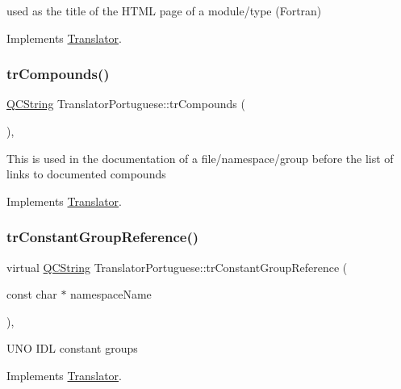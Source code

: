 used as the title of the H\+T\+ML page of a module/type (Fortran) 

Implements \mbox{\hyperlink{class_translator}{Translator}}.

\mbox{\label{class_translator_portuguese_aa974995ae597bf8818937c9e00a4c103}} 
\subsubsection{\texorpdfstring{trCompounds()}{trCompounds()}}
{\footnotesize\ttfamily \mbox{\hyperlink{class_q_c_string}{Q\+C\+String}} Translator\+Portuguese\+::tr\+Compounds (\begin{DoxyParamCaption}{ }\end{DoxyParamCaption})\hspace{0.3cm}{\ttfamily [inline]}, {\ttfamily [virtual]}}

This is used in the documentation of a file/namespace/group before the list of links to documented compounds 

Implements \mbox{\hyperlink{class_translator}{Translator}}.

\mbox{\label{class_translator_portuguese_a874a040dbc8bd0185a93e1f075938a88}} 
\subsubsection{\texorpdfstring{trConstantGroupReference()}{trConstantGroupReference()}}
{\footnotesize\ttfamily virtual \mbox{\hyperlink{class_q_c_string}{Q\+C\+String}} Translator\+Portuguese\+::tr\+Constant\+Group\+Reference (\begin{DoxyParamCaption}\item[{const char $\ast$}]{namespace\+Name }\end{DoxyParamCaption})\hspace{0.3cm}{\ttfamily [inline]}, {\ttfamily [virtual]}}

U\+NO I\+DL constant groups 

Implements \mbox{\hyperlink{class_translator}{Translator}}.

